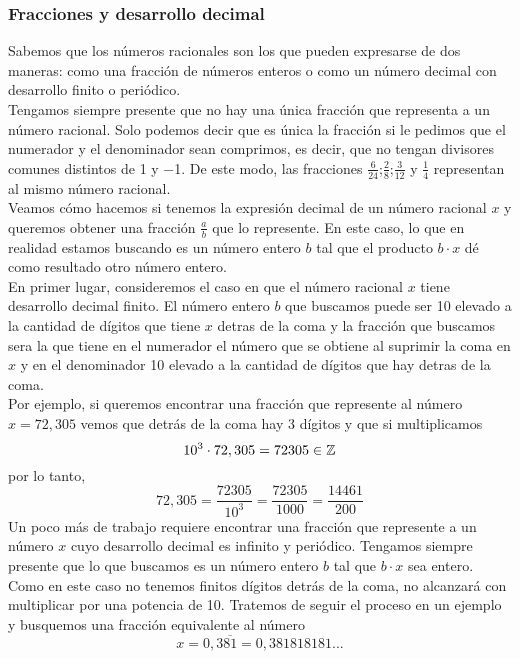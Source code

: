 \documentclass[../Teoría.root.tex]{subfiles}
\begin{document}
\subsubsection{Fracciones y desarrollo decimal}
Sabemos que los números racionales son los que pueden expresarse de dos maneras:
como una fracción de números enteros o como un número decimal con desarrollo finito o periódico.\\
Tengamos siempre presente que no hay una única fracción que representa a un número racional.
Solo podemos decir que es única la fracción si le pedimos que el numerador y el denominador sean comprimos, es decir, que no tengan divisores comunes distintos de 1 y −1.
De este modo, las fracciones \(\frac{6}{24}\);\(\frac{2}{8}\);\(\frac{3}{12}\) y \(\frac{1}{4}\) representan al mismo número racional.\\
Veamos cómo hacemos si tenemos la expresión decimal de un número racional \(x\) y queremos obtener una fracción \(\frac{a}{b}\) que lo represente.
En este caso, lo que en realidad estamos buscando es un número entero \(b\) tal que el producto \(b \cdot x\) dé como resultado otro número entero.\\
En primer lugar, consideremos el caso en que el número racional \(x\) tiene desarrollo decimal finito.
El número entero \(b\) que buscamos puede ser 10 elevado a la cantidad de dígitos que tiene \(x\) detras de la coma y la fracción que buscamos sera la que tiene en el numerador el número que se obtiene al suprimir la coma en \(x\) y en el denominador 10 elevado a la cantidad de dígitos que hay detras de la coma.\\
Por ejemplo, si queremos encontrar una fracción que represente al número \(x = 72,305\) vemos que detrás de la coma hay 3 dígitos y que si multiplicamos
\[10^3\cdot72,305=72305\in\mathbb{Z}\] por lo tanto, \[72,305=\frac{72305}{10^3}=\frac{72305}{1000}=\frac{14461}{200}\]
Un poco más de trabajo requiere encontrar una fracción que represente a un número \(x\) cuyo desarrollo decimal es infinito y periódico.
Tengamos siempre presente que lo que buscamos es un número entero \(b\) tal que \(b \cdot x\) sea entero.
Como en este caso no tenemos finitos dígitos detrás de la coma, no alcanzará con multiplicar por una potencia de 10.
Tratemos de seguir el proceso en un ejemplo y busquemos una fracción equivalente al número \[x=0,3\overline{81}=0,381818181...\]
\end{document}

